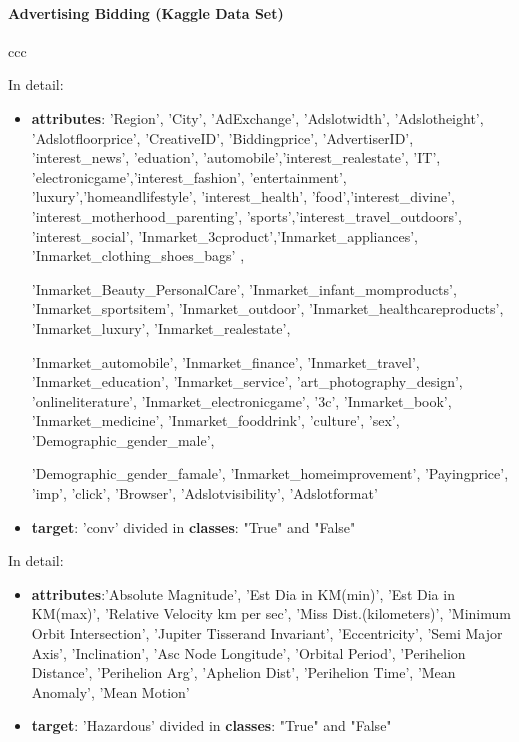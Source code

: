 \documentclass{article}
\begin{document}
\paragraph{Advertising Bidding (Kaggle Data Set)}
ccc

In detail:
\begin{itemize}
	\item  \textbf{attributes}: 'Region', 'City', 'AdExchange', 'Adslotwidth', 'Adslotheight', 'Adslotfloorprice',
	'CreativeID', 'Biddingprice', 'AdvertiserID', 'interest\_news', 'eduation', 'automobile','interest\_realestate', 'IT', 'electronicgame','interest\_fashion', 'entertainment', 'luxury','homeandlifestyle', 'interest\_health', 'food','interest\_divine', 'interest\_motherhood\_parenting', 'sports','interest\_travel\_outdoors', 'interest\_social', 'Inmarket\_3cproduct','Inmarket\_appliances', 'Inmarket\_clothing\_shoes\_bags' ,

	'Inmarket\_Beauty\_PersonalCare', 'Inmarket\_infant\_momproducts',
	'Inmarket\_sportsitem', 'Inmarket\_outdoor', 'Inmarket\_healthcareproducts',
	'Inmarket\_luxury', 'Inmarket\_realestate',

	'Inmarket\_automobile',
	'Inmarket\_finance', 'Inmarket\_travel', 'Inmarket\_education',
	'Inmarket\_service', 'art\_photography\_design',
	'onlineliterature', 'Inmarket\_electronicgame', '3c',
	'Inmarket\_book', 'Inmarket\_medicine', 'Inmarket\_fooddrink',
	'culture', 'sex',
	'Demographic\_gender\_male',

	'Demographic\_gender\_famale', 'Inmarket\_homeimprovement', 'Payingprice',
	'imp', 'click', 'Browser', 'Adslotvisibility', 'Adslotformat' \\

	\item  \textbf{target}: 'conv' divided in \textbf{classes}: "True" and "False"
\end{itemize}

In detail:
\begin{itemize}
	\item  \textbf{attributes}:'Absolute Magnitude', 'Est Dia in KM(min)', 'Est Dia in KM(max)', 'Relative Velocity km per sec', 'Miss Dist.(kilometers)', 'Minimum Orbit Intersection', 'Jupiter Tisserand Invariant', 'Eccentricity', 'Semi Major Axis', 'Inclination', 'Asc Node Longitude', 'Orbital Period', 'Perihelion   Distance', 'Perihelion Arg', 'Aphelion Dist', 'Perihelion Time', 'Mean Anomaly', 'Mean Motion' \\

	\item  \textbf{target}: 'Hazardous' divided in \textbf{classes}: "True" and "False"
\end{itemize}
\end{document}
